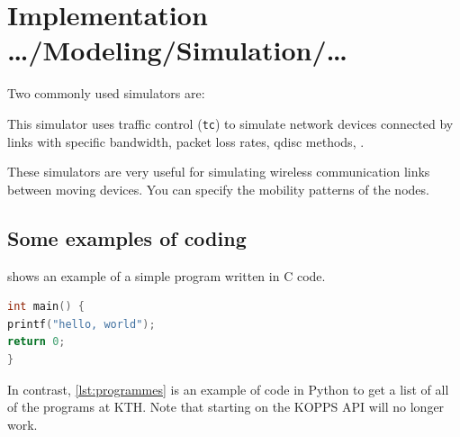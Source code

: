\documentclass[
English,                 %
includepublications,    %
%
%
%
%
%
%
%
%
%
%
%
%
%
%
%
%
%
%
]{kththesis}
\begin{document}
\section{Implementation …/Modeling/Simulation/…}
\label{sec:implementationDetails}

Two commonly used simulators are:
\begin{description}[labelwidth =\widthof{\textbf{ns-2 or ns-3 simulator}}, leftmargin = !]
    \item[\textbf{Mininet}] This simulator uses traffic control (\texttt{tc}) to simulate network devices connected by links with specific bandwidth, packet loss rates, qdisc methods, \etc.
    
    
    \item[\textbf{ns-2 or ns-3 simulator}] These simulators are very useful for simulating wireless communication links between moving devices. You can specify the mobility patterns of the nodes.
\end{description}

\subsection{Some examples of coding}


 shows an example of a simple program written
in C code.

\begin{lstlisting}[language={C}, caption={Hello world in C code}, label=lst:helloWorldInC]
int main() {
printf("hello, world");
return 0;
}
\end{lstlisting}


In contrast, \cref{lst:programmes} is an example of code in Python to
get a list of all of the programs at KTH. Note that starting on {} the KOPPS API will no longer work.
\end{document}
